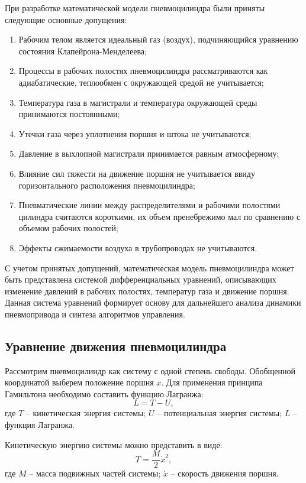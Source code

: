 При разработке математической модели пневмоцилиндра были приняты следующие основные допущения:
\begin{enumerate}
    \item Рабочим телом является идеальный газ (воздух), подчиняющийся уравнению состояния Клапейрона-Менделеева;
    \item Процессы в рабочих полостях пневмоцилиндра рассматриваются как адиабатические, теплообмен с окружающей средой не учитывается;
    \item Температура газа в магистрали и температура окружающей среды принимаются постоянными;
    \item Утечки газа через уплотнения поршня и штока не учитываются;
    \item Давление в выхлопной магистрали принимается равным атмосферному;
    \item Влияние сил тяжести на движение поршня не учитывается ввиду горизонтального расположения пневмоцилиндра;
    \item Пневматические линии между распределителями и рабочими полостями цилиндра считаются короткими,
          их объем пренебрежимо мал по сравнению с объемом рабочих полостей;
    \item Эффекты сжимаемости воздуха в трубопроводах не учитываются.
\end{enumerate}

С учетом принятых допущений, математическая модель пневмоцилиндра может быть представлена системой
дифференциальных уравнений, описывающих изменение давлений в рабочих полостях, температур газа и
движение поршня. Данная система уравнений формирует основу для дальнейшего анализа динамики пневмопривода
и синтеза алгоритмов управления.

\subsection{Уравнение движения пневмоцилиндра}\label{sec:ch2/sec2/subsec1}

Рассмотрим пневмоцилиндр как систему с одной степень свободы. Обобщенной координатой выберем положение поршня $x$.
Для применения принципа Гамильтона необходимо составить функцию Лагранжа:
\begin{equation}
\label{eq:ch2/eq0}
    L = T - U,
\end{equation}
где $T$ -- кинетическая энергия системы; $U$ -- потенциальная энергия системы; $L$ -- функция Лагранжа.

Кинетическую энергию системы можно представить в виде:
\begin{equation}
\label{eq:ch2/eq1}
    T = \frac{M}{2} \dot{x}^2,
\end{equation}
где $M$ -- масса подвижных частей системы; $\dot{x}$ -- скорость движения поршня.

